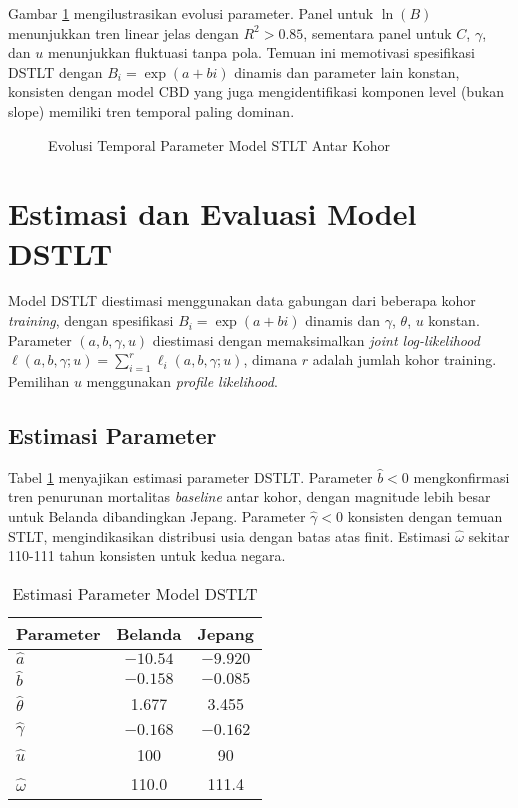 Gambar \ref{fig:parameter_evolution} mengilustrasikan evolusi parameter. Panel untuk $\ln(B)$ menunjukkan tren linear jelas dengan $R^2 > 0.85$, sementara panel untuk $C$, $\gamma$, dan $u$ menunjukkan fluktuasi tanpa pola. Temuan ini memotivasi spesifikasi DSTLT dengan $B_i = \exp(a + bi)$ dinamis dan parameter lain konstan, konsisten dengan model CBD \citep{cairns2006pricing} yang juga mengidentifikasi komponen level (bukan slope) memiliki tren temporal paling dominan.

\begin{figure}[htbp]
\centering
\caption{Evolusi Temporal Parameter Model STLT Antar Kohor}
\label{fig:parameter_evolution}
\end{figure}

\section{Estimasi dan Evaluasi Model DSTLT}

Model DSTLT diestimasi menggunakan data gabungan dari beberapa kohor \textit{training}, dengan spesifikasi $B_i = \exp(a + bi)$ dinamis dan $\gamma$, $\theta$, $u$ konstan. Parameter $(a, b, \gamma, u)$ diestimasi dengan memaksimalkan \textit{joint log-likelihood} $\ell(a, b, \gamma; u) = \sum_{i=1}^{r} \ell_i(a, b, \gamma; u)$, dimana $r$ adalah jumlah kohor training. Pemilihan $u$ menggunakan \textit{profile likelihood}.

\subsection{Estimasi Parameter}

Tabel \ref{tab:dstlt_parameters} menyajikan estimasi parameter DSTLT. Parameter $\hat{b} < 0$ mengkonfirmasi tren penurunan mortalitas \textit{baseline} antar kohor, dengan magnitude lebih besar untuk Belanda dibandingkan Jepang. Parameter $\hat{\gamma} < 0$ konsisten dengan temuan STLT, mengindikasikan distribusi usia dengan batas atas finit. Estimasi $\hat{\omega}$ sekitar 110-111 tahun konsisten untuk kedua negara.

\begin{table}[H]
\centering
\caption{Estimasi Parameter Model DSTLT}
\label{tab:dstlt_parameters}
\begin{tabular}{lcc}
\hline
\textbf{Parameter} & \textbf{Belanda} & \textbf{Jepang} \\
\hline
$\hat{a}$ & $-10.54$ & $-9.920$ \\
$\hat{b}$ & $-0.158$ & $-0.085$ \\
$\hat{\theta}$ & 1.677 & 3.455 \\
$\hat{\gamma}$ & $-0.168$ & $-0.162$ \\
$\hat{u}$ & 100 & 90 \\
$\hat{\omega}$ & 110.0 & 111.4 \\
\hline
\end{tabular}
\end{table}

